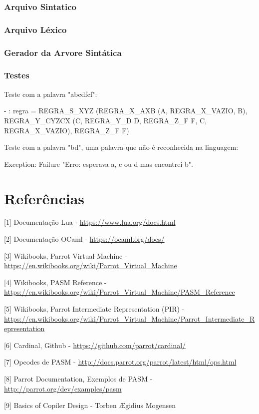 \documentclass[12pt,a4paper,twoside]{report}
\begin{document}
\subsection{Arquivo Sintatico}

\subsection{Arquivo Léxico}

\subsection{Gerador da Arvore Sintática}

\subsection{Testes}
Teste com a palavra "abcdfcf":
\begin{terminal}
- : regra =
REGRA_S_XYZ (REGRA_X_AXB (A, REGRA_X_VAZIO, B),
 REGRA_Y_CYZCX (C, REGRA_Y_D D, REGRA_Z_F F, C, REGRA_X_VAZIO), REGRA_Z_F F)
 \end{terminal}

Teste com a palavra "bd", uma palavra que não é reconhecida na linguagem:

\begin{terminal}
Exception: Failure "Erro: esperava a, c ou d mas encontrei b".
 \end{terminal}


\chapter{Referências}
[1] Documentação Lua - \url{https://www.lua.org/docs.html}

[2] Documentação OCaml - \url{https://ocaml.org/docs/}

[3] Wikibooks, Parrot Virtual Machine - \url{https://en.wikibooks.org/wiki/Parrot_Virtual_Machine}

[4] Wikibooks, PASM Reference - \url{https://en.wikibooks.org/wiki/Parrot_Virtual_Machine/PASM_Reference}

[5] Wikibooks, Parrot Intermediate Representation (PIR) - \url{https://en.wikibooks.org/wiki/Parrot_Virtual_Machine/Parrot_Intermediate_Representation}

[6] Cardinal, Github - \url{https://github.com/parrot/cardinal/}

[7] Opcodes de PASM - \url{http://docs.parrot.org/parrot/latest/html/ops.html}

[8] Parrot Documentation, Exemplos de PASM - \url{http://parrot.org/dev/examples/pasm}

[9] Basics of Copiler Design - Torben Ægidius Mogensen

\clearpage
{}
\appendix
\end{document}

